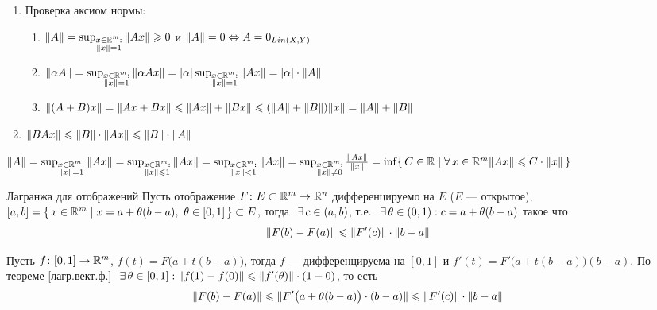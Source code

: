 \begin{prf}
	\begin{enumerate}
		\item Проверка аксиом нормы:
		\begin{enumerate}
		\item $\|A\| = \sup_{\substack{x \in \mathbb R^m : \\ \|x\| = 1}} \|Ax\| \geqslant 0$ и $\|A\| = 0 \Leftrightarrow A = 0_{Lin(X, Y)}$
		
		\item $\|\alpha A\| = \sup_{\substack{x \in \mathbb R^m: \\ \|x\| = 1}} \|\alpha Ax\| = |\alpha| \sup_{\substack{x \in \mathbb R^m: \\ \|x\| = 1}} \|Ax\| = |\alpha| \cdot \|A\|$
		
		\item $\|(A + B)x\| = \|Ax + Bx\| \leqslant \|Ax\| + \|Bx\| \leqslant (\|A\| + \|B\|) \|x\| = \|A\| + \|B\|$
		\end{enumerate}
		
	\item $\|BAx\| \leqslant \|B\|\cdot \|Ax\| \leqslant \|B\| \cdot \|A\|$
	\end{enumerate}
\end{prf}
\pagebreak
\begin{zam}[https://youtu.be/OazzLm0DJN4?si=gixxNia3dTgatT7R&t=3022]
	$\|A\| 
	= \sup_{\substack{x \in \rmm: \\ \|x\| = 1}}\|Ax\|
	= \sup_{\substack{x \in \rmm: \\ \|x\| \< 1}}\|Ax\| 
	= \sup_{\substack{x \in \rmm: \\ \|x\| < 1}}\|Ax\| 
	= \sup_{\substack{x \in \rmm: \\ \|x\| \ne 0}} \frac{\|Ax\|}{\|x\|} \medskip = \inf\{\,C\in \rr \mid \A x \in \rmm \|Ax\| \< C \cdot \|x\|\,\}$ 
\end{zam}

\begin{teor}[https://youtu.be/OazzLm0DJN4?si=JvVhDSiKtEYa2cTH&t=3281]{Лагранжа для отображений}
	Пусть отображение $F \colon E \subset \mathbb R^m \to \mathbb R^n$ дифференцируемо на $E$ ($E$ --- открытое), $[a, b] = \{\, x \in \rmm \mid \linebreak x = a + \theta (b - a),\ \theta \in [0, 1]\,\} \subset E$, тогда$\E c \in (a, b)$, т.е.$\E \theta \in (0, 1) : c = a + \theta(b - a)$ такое что
	\[\|F(b) - F(a)\| \leqslant \|F'(c)\| \cdot \|b - a\|\] 
\end{teor}           

\begin{prf}
	Пусть $f \colon [0, 1] \to \mathbb R^m$, $f(t) = F\bigl(a + t(b - a)\bigr)$, тогда $f$ --- дифференцируема \smallskip на $[0, 1]$ и $f'(t) = F'\bigl(a + t(b-a)\bigr)(b - a)$. По теореме \ref{лагр.вект.ф.}$\hspace{7pt plus 1pt minus 2pt} \exists \, \theta \in [0, 1] : \|f(1) - f(0)\| \leqslant \|f'(\theta)\| \cdot (1 - 0)$, {то есть\linebreak} \[\|F(b) - F(a)\| \leqslant \|F'\bigl(a + \theta(b - a)\bigr)\cdot (b - a)\| \leqslant \|F'(c)\|\cdot\|b - a\| \] 
\end{prf}

